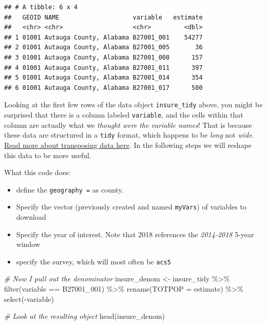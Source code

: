 \documentclass[
]{book}
\newenvironment{Shaded}{\begin{snugshade}}{\end{snugshade}}
\newcommand{\AttributeTok}[1]{\textcolor[rgb]{0.77,0.63,0.00}{#1}}
\newcommand{\CommentTok}[1]{\textcolor[rgb]{0.56,0.35,0.01}{\textit{#1}}}
\newcommand{\FunctionTok}[1]{\textcolor[rgb]{0.00,0.00,0.00}{#1}}
\newcommand{\NormalTok}[1]{#1}
\newcommand{\OtherTok}[1]{\textcolor[rgb]{0.56,0.35,0.01}{#1}}
\newcommand{\SpecialCharTok}[1]{\textcolor[rgb]{0.00,0.00,0.00}{#1}}
\newcommand{\StringTok}[1]{\textcolor[rgb]{0.31,0.60,0.02}{#1}}
\providecommand{\tightlist}{%
  \setlength{\itemsep}{0pt}\setlength{\parskip}{0pt}}
\begin{document}
\begin{verbatim}
## # A tibble: 6 x 4
##   GEOID NAME                    variable   estimate
##   <chr> <chr>                   <chr>         <dbl>
## 1 01001 Autauga County, Alabama B27001_001    54277
## 2 01001 Autauga County, Alabama B27001_005       36
## 3 01001 Autauga County, Alabama B27001_008      157
## 4 01001 Autauga County, Alabama B27001_011      397
## 5 01001 Autauga County, Alabama B27001_014      354
## 6 01001 Autauga County, Alabama B27001_017      500
\end{verbatim}

\begin{rmdwarning}
Looking at the first few rows of the data object \texttt{insure\_tidy} above, you might be surprised that there is a column labeled \texttt{variable}, and the cells within that column are actually what we \emph{thought were the variable names}! That is because these data are structured in a \texttt{tidy} format, which happens to be \emph{long} not \emph{wide}. \protect\hyperlink{pivot_}{Read more about transposing data here}. In the following steps we will reshape this data to be more useful.

\end{rmdwarning}

What this code does:

\begin{itemize}
\tightlist
\item
  define the \texttt{geography\ =} as county.
\item
  Specify the vector (previously created and named \texttt{myVars}) of variables to download
\item
  Specify the year of interest. Note that 2018 references the \emph{2014-2018} 5-year window
\item
  specify the survey, which will most often be \texttt{acs5}
\end{itemize}

\begin{Shaded}
\begin{Highlighting}[]
\CommentTok{\# Now I pull out the denominator}
\NormalTok{insure\_denom }\OtherTok{\textless{}{-}}\NormalTok{ insure\_tidy }\SpecialCharTok{\%\textgreater{}\%}
  \FunctionTok{filter}\NormalTok{(variable }\SpecialCharTok{==} \StringTok{\textquotesingle{}B27001\_001\textquotesingle{}}\NormalTok{) }\SpecialCharTok{\%\textgreater{}\%}
  \FunctionTok{rename}\NormalTok{(}\AttributeTok{TOTPOP =}\NormalTok{ estimate) }\SpecialCharTok{\%\textgreater{}\%}
  \FunctionTok{select}\NormalTok{(}\SpecialCharTok{{-}}\NormalTok{variable)}

\CommentTok{\# Look at the resulting object}
\FunctionTok{head}\NormalTok{(insure\_denom)}
\end{Highlighting}
\end{Shaded}
\end{document}
